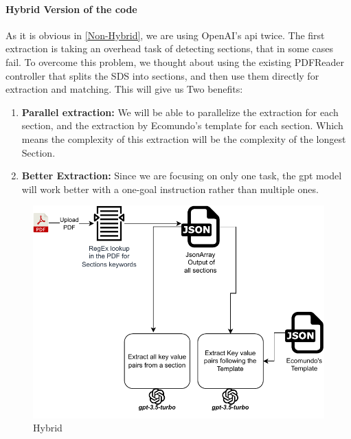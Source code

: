 \documentclass[a4paper,12pt,twoside]{report}
\begin{document}
\paragraph{Hybrid Version of the code}
As it is obvious in \ref{Non-Hybrid}, we are using OpenAI's api twice. The first extraction is taking an overhead task of detecting sections, that in some cases fail. To overcome this problem, we thought about using the existing PDFReader controller that splits the SDS into sections, and then use them directly for extraction and matching. This will give us Two benefits:
\begin{enumerate}
\item \textbf{Parallel extraction:} We will be able to parallelize the extraction for each section, and the extraction by Ecomundo's template for each section. Which means the complexity of this extraction will be the complexity of the longest Section. 
\item \textbf{Better Extraction:} Since we are focusing on only one task, the gpt model will work better with a one-goal instruction rather than multiple ones.
\end{enumerate}
\begin{figure}[H]
		\includegraphics[width=\textwidth, keepaspectratio ]{images/hybrid}
	\caption[How the Hybrid code works]{Hybrid}
\label{Hybrid}
\end{figure}
\end{document}
